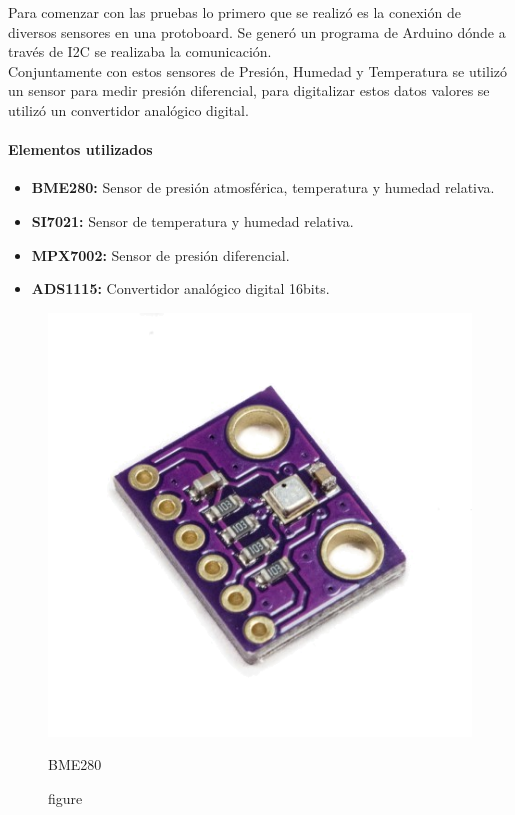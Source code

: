Para comenzar con las pruebas lo primero que se realizó es la conexión de diversos sensores en una protoboard. Se generó un programa de Arduino dónde a través de I2C se realizaba la comunicación. \\ Conjuntamente con estos sensores de Presión, Humedad y Temperatura se utilizó un sensor para medir presión diferencial, para digitalizar estos datos valores se utilizó un convertidor analógico digital.

\paragraph*{Elementos utilizados}
		\begin{itemize}
			\item  \textbf{BME280:} Sensor de presión atmosférica, temperatura y humedad relativa.
			\item \textbf{SI7021:} Sensor de temperatura y humedad relativa.
			\item \textbf{MPX7002:} Sensor de presión diferencial.
			\item \textbf{ADS1115:} Convertidor analógico digital 16bits.
		\end{itemize}

\begin{figure}[htb]
	\centering
	\includegraphics[scale=0.35]{bme280.png}
	\caption{figure}{BME280}
	\label{fig:BME280}
\end{figure}

